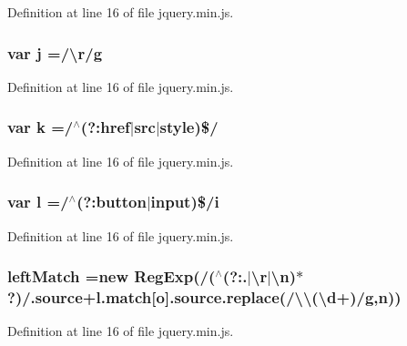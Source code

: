 Definition at line 16 of file jquery.\-min.\-js.

\subsubsection[{j}]{\setlength{\rightskip}{0pt plus 5cm}var j =/\textbackslash{}{\bf r}/{\bf g}}\label{jquery_8min_8js_aab858032a95af802114b255fac6f45f2}


Definition at line 16 of file jquery.\-min.\-js.

\subsubsection[{k}]{\setlength{\rightskip}{0pt plus 5cm}var k =/$^\wedge$(?\-:href$|$src$|$style)\$/}\label{jquery_8min_8js_ab26645c014aa005ecedef329ecf58c99}


Definition at line 16 of file jquery.\-min.\-js.

\subsubsection[{l}]{\setlength{\rightskip}{0pt plus 5cm}var l =/$^\wedge$(?\-:button$|$input)\$/{\bf i}}\label{jquery_8min_8js_ae5e71a2600e8891c54854be157cc6626}


Definition at line 16 of file jquery.\-min.\-js.

\subsubsection[{left\-Match}]{ left\-Match =new Reg\-Exp(/($^\wedge$(?\-:.$|$\textbackslash{}{\bf r}$|$\textbackslash{}{\bf n})$\ast$?)/.source+l.\-match[{\bf o}].source.\-replace(/\textbackslash{}\textbackslash{}(\textbackslash{}d+)/{\bf g},{\bf n}))}\label{jquery_8min_8js_a851754dfd3467dc458a4e326465cf777}


Definition at line 16 of file jquery.\-min.\-js.

